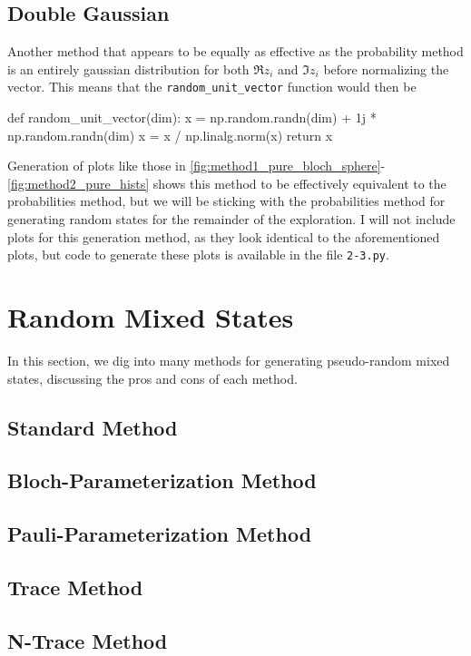 \documentclass{paper}[11pt]
\begin{document}
	\subsection{Double Gaussian}
	Another method that appears to be equally as effective as the probability method is an entirely gaussian distribution for both $\Re z_i$ and $\Im z_i$ before normalizing the vector. This means that the \texttt{random\_unit\_vector} function would then be
	\begin{verbatimtab}
		def random_unit_vector(dim):
			x = np.random.randn(dim) + 1j * np.random.randn(dim)
			x = x / np.linalg.norm(x)
    		return x
	\end{verbatimtab}
	
	Generation of plots like those in \cref{fig:method1_pure_bloch_sphere}-\ref{fig:method2_pure_hists} shows this method to be effectively equivalent to the probabilities method, but we will be sticking with the probabilities method for generating random states for the remainder of the exploration. I will not include plots for this generation method, as they look identical to the aforementioned plots, but code to generate these plots is available in the file \texttt{2-3.py}.
	
	\section{Random Mixed States}
	
	In this section, we dig into many methods for generating pseudo-random mixed states, discussing the pros and cons of each method.
	
	\subsection{Standard Method}
	\subsection{Bloch-Parameterization Method}
	\subsection{Pauli-Parameterization Method}
	\subsection{Trace Method}
	\subsection{N-Trace Method}
\end{document}
